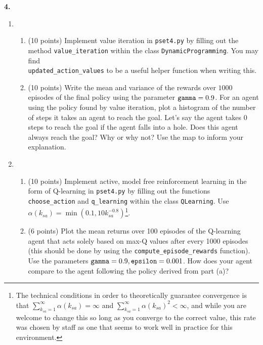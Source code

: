 \documentclass[12pt]{amsart}
\newenvironment{statement}[1]{\smallskip\noindent\color[rgb]{0.0,0.0,0.0} {\bf #1.}}{}
\theoremstyle{definition}
\theoremstyle{remark}
\newcommand{\1}{\mathds{1}}
\begin{document}
\begin{statement}{4}
\begin{enumerate}
    \item
    \begin{enumerate}
        \item (10 points) Implement value iteration in \texttt{pset4.py} by filling out the method \verb|value_iteration| within the class \verb|DynamicProgramming|. You may find \\ \verb|updated_action_values| to be a useful helper function when writing this.
        \item (10 points) Write the mean and variance of the rewards over $1000$ episodes of the final policy using the parameter $\verb|gamma| = 0.9$. For an agent using the policy found by value iteration, plot a histogram of the number of steps it takes an agent to reach the goal. Let's say the agent takes 0 steps to reach the goal if the agent falls into a hole. Does this agent always reach the goal? Why or why not? Use the map to inform your explanation.
    \end{enumerate}
    \item 
    \begin{enumerate}
    \item (10 points) Implement active, model free reinforcement learning in the form of Q-learning in \texttt{pset4.py} by filling out the functions \verb|choose_action| and \verb|q_learning| within the class \verb|QLearning|.
    Use $\alpha(k_{sa}) = \min(0.1, 10 k_{sa}^{-0.8})$\footnote{The technical conditions in order to theoretically guarantee convergence is that $\sum_{k_{sa}=1}^\infty \alpha(k_{sa}) = \infty$ and $\sum_{k_{sa}=1}^\infty \alpha(k_{sa})^2 < \infty$, and while you are welcome to change this so long as you converge to the correct value, this rate was chosen by staff as one that seems to work well in practice for this environment.}.
    \item (6 points) Plot the mean returns over 100 episodes of the Q-learning agent that acts solely based on max-Q values after every 1000 episodes (this should be done by using the \verb|compute_episode_rewards| function). Use the parameters $\verb|gamma|=0.9, \verb|epsilon|=0.001$. How does your agent compare to the agent following the policy derived from part (a)?
    \end{enumerate}
\end{enumerate}

\end{statement}
\end{document}
